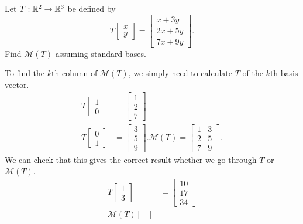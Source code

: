 \begin{example}
	Let $T: \mathbb{R}^2 \to \mathbb{R}^3$ be defined by
	\begin{equation*}
		T\begin{bmatrix}
			x \\ y
		\end{bmatrix} = \begin{bmatrix}
			x+3y \\ 2x+5y \\ 7x+9y
		\end{bmatrix}.
	\end{equation*}
	Find $\mathcal{M}(T)$ assuming standard bases.
\end{example}
\begin{answer}
	To find the $k$th column of $\mathcal{M}(T)$, we simply need to calculate $T$ of the $k$th basis vector.
	\begin{align*}
		T\begin{bmatrix}
			1 \\ 0
		\end{bmatrix} &= \begin{bmatrix}
			1 \\ 2 \\ 7
		\end{bmatrix} \\
		T\begin{bmatrix}
			0 \\ 1
		\end{bmatrix} &= \begin{bmatrix}
			3 \\ 5 \\ 9
		\end{bmatrix}.
		\mathcal{M}(T) = \begin{bmatrix}
			1 & 3 \\
			2 & 5 \\
			7 & 9
		\end{bmatrix}.
	\end{align*}
	We can check that this gives the correct result whether we go through $T$ or $\mathcal{M}(T)$.
	\begin{align*}
		T\begin{bmatrix}
			1 \\ 3
		\end{bmatrix} &= \begin{bmatrix}
			10 \\ 17 \\ 34
		\end{bmatrix} \\
		\mathcal{M}(T)\begin{bmatrix}

\end{bmatrix}
\end{align*}
\end{answer}
